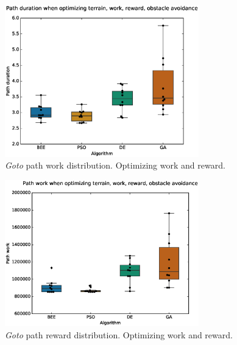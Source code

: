 \documentclass{tamuccthesis}
\begin{document}
\begin{figure}[H]
    \captionsetup{justification=centering}
    \centering
    \includegraphics[width=0.75\textwidth,trim={0cm 0.75cm 0cm 0.75cm},clip]{EXP3_histo_duration_b.eps}
    \caption{\textit{Goto} path work distribution. Optimizing work and reward. }
    \label{fig:algcompare_b_duration}
\end{figure}

\begin{figure}[H]
    \captionsetup{justification=centering}
    \centering
    \includegraphics[width=0.75\textwidth,trim={0cm 0.75cm 0cm 0.75cm},clip]{EXP3_histo_work_b.eps}
    \caption{\textit{Goto} path reward distribution. Optimizing work and reward. }
    \label{fig:algcompare_b_work}
\end{figure}
\end{document}
